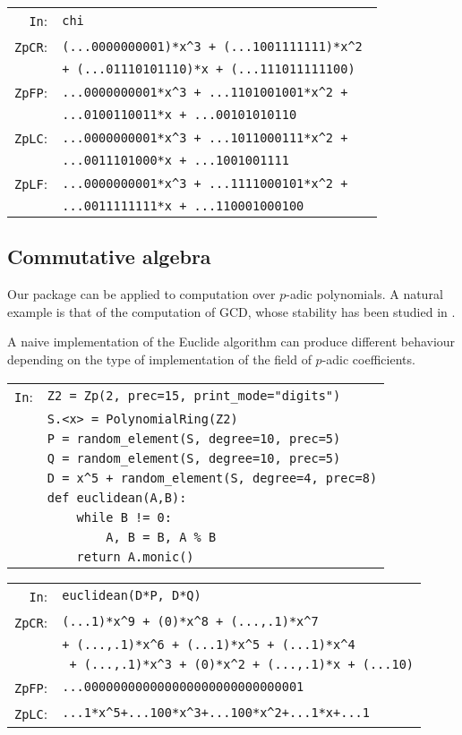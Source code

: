 \documentclass[sigconf]{acmart}
\newcommand{\cIn}{{\color{blue} \tt \phantom{Zp}In}:}
\newcommand{\cZpCR}{{\color{red} \tt ZpCR}:}
\newcommand{\cZpFP}{{\color{red} \tt ZpFP}:}
\newcommand{\cZpLC}{{\color{red} \tt ZpLC}:}
\newcommand{\cZpLF}{{\color{red} \tt ZpLF}:}
\theoremstyle{definition}
\begin{document}
\begin{tabular}{rl}
\cIn
 & \verb?chi? \\
\cZpCR
 & \verb?(...0000000001)*x^3 + (...1001111111)*x^2 ?\\
 & \verb?+ (...01110101110)*x + (...111011111100)? \\
\cZpFP
 & \verb?...0000000001*x^3 + ...1101001001*x^2 + ?\\
 & \verb?...0100110011*x + ...00101010110? \\
\cZpLC
 & \verb?...0000000001*x^3 + ...1011000111*x^2 + ?\\
 & \verb?...0011101000*x + ...1001001111? \\
\cZpLF
 & \verb?...0000000001*x^3 + ...1111000101*x^2 + ?\\
 & \verb?...0011111111*x + ...110001000100? \\
\end{tabular}

\subsection{Commutative algebra}

Our package can be applied to
computation over $p$-adic polynomials.
A natural example is that of the computation of GCD,
whose stability has been studied in \cite{caruso-2017}.

A naive implementation of the Euclide algorithm
can produce different behaviour depending 
on the type of implementation of the field
of $p$-adic coefficients.

\begin{tabular}{rl}
\cIn
 & \verb?Z2 = Zp(2, prec=15, print_mode="digits")? \\
  & \verb?S.<x> = PolynomialRing(Z2)? \\
 & \verb?P = random_element(S, degree=10, prec=5)? \\
 & \verb?Q = random_element(S, degree=10, prec=5)? \\
 & \verb?D = x^5 + random_element(S, degree=4, prec=8)? \\
 & \verb?def euclidean(A,B):? \\
 & \verb?    while B != 0:? \\
 & \verb?        A, B = B, A % B? \\
 & \verb?    return A.monic()? \\
\end{tabular}


\begin{tabular}{rl}
\cIn
  & \verb?euclidean(D*P, D*Q)? \\
\cZpCR
 & \verb?(...1)*x^9 + (0)*x^8 + (...,.1)*x^7 ?\\
 & \verb?+ (...,.1)*x^6 + (...1)*x^5 + (...1)*x^4?\\
 & \verb? + (...,.1)*x^3 + (0)*x^2 + (...,.1)*x + (...10)? \\
\cZpFP
 & \verb?...000000000000000000000000000001? \\
\cZpLC
 & \verb?...1*x^5+...100*x^3+...100*x^2+...1*x+...1? \\
\end{tabular}
\end{document}
